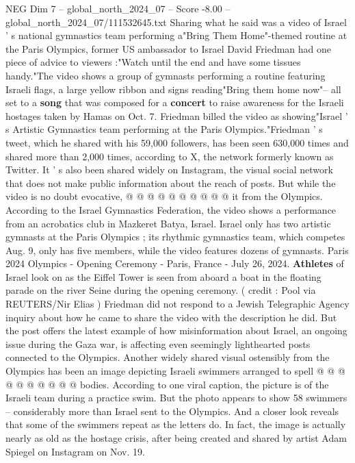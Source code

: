 \begin{textsample}{NEG Dim 7 – global\_north\_2024\_07 – Score -8.00 – global\_north\_2024\_07/111532645.txt}  \label{ex:f7_neg_115}
Sharing what he said was a video of Israel ' s national gymnastics team performing a"Bring Them Home"-themed routine at the Paris Olympics, former US ambassador to Israel David Friedman had one piece of advice to viewers :"Watch until the end and have some tissues handy."The video shows a group of gymnasts performing a routine featuring Israeli flags, a large yellow ribbon and signs reading"Bring them home now"-- all set to a \textbf{song} that was composed for a \textbf{concert} to raise awareness for the Israeli hostages taken by Hamas on Oct. 7.
Friedman billed the video as showing"Israel ' s Artistic Gymnastics team performing at the Paris Olympics."Friedman ' s tweet, which he shared with his 59,000 followers, has been seen 630,000 times and shared more than 2,000 times, according to X, the network formerly known as Twitter.
It ' s also been shared widely on Instagram, the visual social network that does not make public information about the reach of posts.
But while the video is no doubt evocative, @ @ @ @ @ @ @ @ @ @ it from the Olympics.
According to the Israel Gymnastics Federation, the video shows a performance from an acrobatics club in Mazkeret Batya, Israel.
Israel only has two artistic gymnasts at the Paris Olympics ; its rhythmic gymnastics team, which competes Aug. 9, only has five members, while the video features dozens of gymnasts.
Paris 2024 Olympics - Opening Ceremony - Paris, France - July 26, 2024. \textbf{Athletes} of Israel look on as the Eiffel Tower is seen from aboard a boat in the floating parade on the river Seine during the opening ceremony. ( credit : Pool via REUTERS/Nir Elias ) Friedman did not respond to a Jewish Telegraphic Agency inquiry about how he came to share the video with the description he did.
But the post offers the latest example of how misinformation about Israel, an ongoing issue during the Gaza war, is affecting even seemingly lighthearted posts connected to the Olympics.
Another widely shared visual ostensibly from the Olympics has been an image depicting Israeli swimmers arranged to spell @ @ @ @ @ @ @ @ @ @ bodies.
According to one viral caption, the picture is of the Israeli team during a practice swim.
But the photo appears to show 58 swimmers -- considerably more than Israel sent to the Olympics.
And a closer look reveals that some of the swimmers repeat as the letters do.
In fact, the image is actually nearly as old as the hostage crisis, after being created and shared by artist Adam Spiegel on Instagram on Nov. 19.

\end{textsample}
